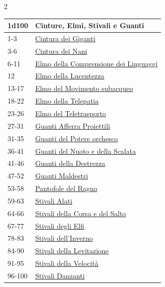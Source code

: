\begin{multicols}{2}
{{\small\begin{tabularx}{\linewidth}{ll}
	\toprule
\rowcolor{gray!20}\textbf{1d100} & \textbf{Cinture, Elmi, Stivali e Guanti}\\
\toprule
1-3 & \hyperlink{Cintura dei Giganti}{Cintura dei Giganti}\\
\rowcolor{gray!20}3-6 & \hyperlink{Cintura dei Nani}{Cintura dei Nani}\\
6-11 & \hyperlink{Elmo della Comprensione dei Linguaggi}{Elmo della Comprensione dei Linguaggi}\\
\rowcolor{gray!20}12 & \hyperlink{Elmo della Lucentezza}{Elmo della Lucentezza}\\
13-17 & \hyperlink{Elmo del Movimento subacqueo}{Elmo del Movimento subacqueo}\\
\rowcolor{gray!20}18-22 & \hyperlink{Elmo della Telepatia}{Elmo della Telepatia}\\
23-26 & \hyperlink{Elmo del Teletrasporto}{Elmo del Teletrasporto}\\
\rowcolor{gray!20}27-31 & \hyperlink{Guanti Afferra Proiettili}{Guanti Afferra Proiettili}\\
31-35 & \hyperlink{Guanti del Potere orchesco}{Guanti del Potere orchesco}\\
\rowcolor{gray!20}36-41 & \hyperlink{Guanti del Nuoto e della Scalata}{Guanti del Nuoto e della Scalata}\\
41-46 & \hyperlink{Guanti della Destrezza}{Guanti della Destrezza}\\
\rowcolor{gray!20}47-52 & \hyperlink{Guanti Maldestri}{Guanti Maldestri}\\
53-58 & \hyperlink{Pantofole del Ragno}{Pantofole del Ragno}\\
\rowcolor{gray!20}59-63 & \hyperlink{Stivali Alati}{Stivali Alati}\\
64-66 & \hyperlink{Stivali della Corsa e del Salto}{Stivali della Corsa e del Salto}\\
\rowcolor{gray!20}67-77 & \hyperlink{Stivali degli Elfi}{Stivali degli Elfi}\\
78-83 & \hyperlink{Stivali dell'Inverno}{Stivali dell'Inverno}\\
\rowcolor{gray!20}84-90 & \hyperlink{Stivali della Levitazione}{Stivali della Levitazione}\\
91-95 & \hyperlink{Stivali della Velocità}{Stivali della Velocità}\\
\rowcolor{gray!20}96-100 & \hyperlink{Stivali Danzanti}{Stivali Danzanti}\\
\end{tabularx}}

}
\end{multicols}
